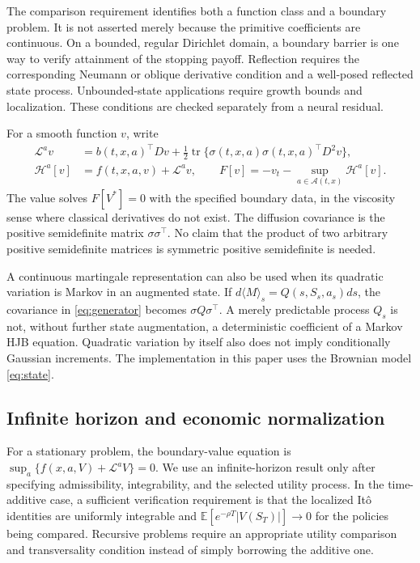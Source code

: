 \documentclass[ecta,nameyear,draft]{econsocart}
\theoremstyle{definition}
\theoremstyle{remark}
\newcommand{\E}{\mathbb E}
\newcommand{\HH}{\mathcal H}
\newcommand{\LL}{\mathcal L}
\newcommand{\Act}{\mathcal A}
\newcommand{\tr}{\operatorname{tr}}
\begin{document}
The comparison requirement identifies both a function class and a boundary problem. It is not asserted merely because the primitive coefficients are continuous. On a bounded, regular Dirichlet domain, a boundary barrier is one way to verify attainment of the stopping payoff. Reflection requires the corresponding Neumann or oblique derivative condition and a well-posed reflected state process. Unbounded-state applications require growth bounds and localization. These conditions are checked separately from a neural residual.

For a smooth function $v$, write
\begin{align}
 \LL^a v&=b(t,x,a)^\top Dv+\tfrac12\tr\{\sigma(t,x,a)\sigma(t,x,a)^\top D^2v\},\label{eq:generator}\\
 \HH^a[v]&=f(t,x,a,v)+\LL^a v,\qquad
 F[v]=-v_t-\sup_{a\in\Act(t,x)}\HH^a[v].\label{eq:hjb}
\end{align}
The value solves $F[V^*]=0$ with the specified boundary data, in the viscosity sense where classical derivatives do not exist. The diffusion covariance is the positive semidefinite matrix $\sigma\sigma^\top$. No claim that the product of two arbitrary positive semidefinite matrices is symmetric positive semidefinite is needed.

A continuous martingale representation can also be used when its quadratic variation is Markov in an augmented state. If $d\langle M\rangle_s=Q(s,S_s,a_s)ds$, the covariance in \eqref{eq:generator} becomes $\sigma Q\sigma^\top$. A merely predictable process $Q_s$ is not, without further state augmentation, a deterministic coefficient of a Markov HJB equation. Quadratic variation by itself also does not imply conditionally Gaussian increments. The implementation in this paper uses the Brownian model \eqref{eq:state}.

\subsection{Infinite horizon and economic normalization}
For a stationary problem, the boundary-value equation is $\sup_a\{f(x,a,V)+\LL^aV\}=0$. We use an infinite-horizon result only after specifying admissibility, integrability, and the selected utility process. In the time-additive case, a sufficient verification requirement is that the localized It\^o identities are uniformly integrable and $\E[e^{-\rho T}|V(S_T)|]\to0$ for the policies being compared. Recursive problems require an appropriate utility comparison and transversality condition instead of simply borrowing the additive one.
\end{document}
